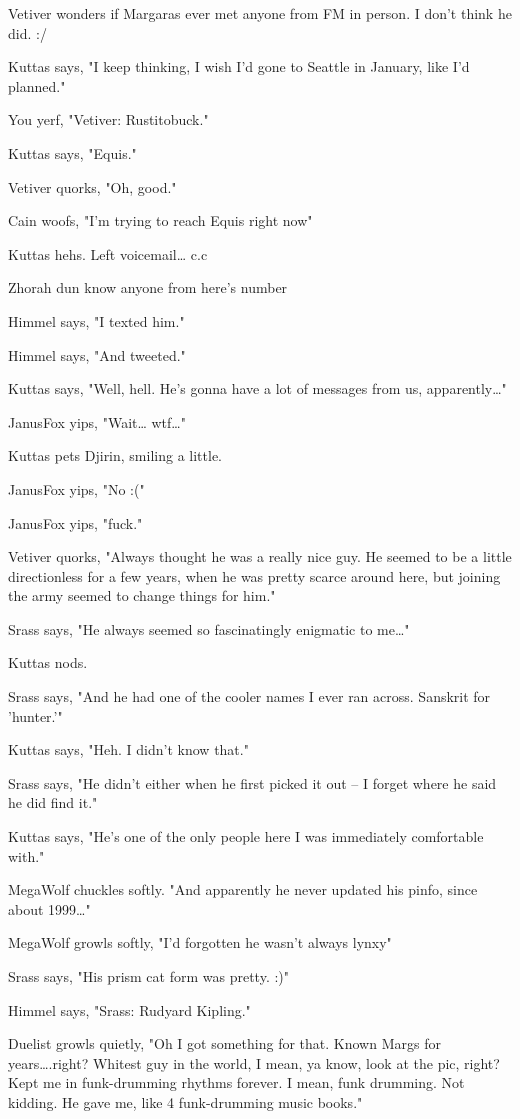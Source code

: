 \begin{hangparas}{2em}{1}
Vetiver wonders if Margaras ever met anyone from FM in person. I don't think he did. :/

Kuttas says, "I keep thinking, I wish I'd gone to Seattle in January, like I'd planned."

You yerf, "Vetiver: Rustitobuck."

Kuttas says, "Equis."

Vetiver quorks, "Oh, good."

Cain woofs, "I'm trying to reach Equis right now"

Kuttas hehs. Left voicemail\ldots{} c.c

Zhorah dun know anyone from here's number

Himmel says, "I texted him."

Himmel says, "And tweeted."

Kuttas says, "Well, hell. He's gonna have a lot of messages from us, apparently\ldots{}"

JanusFox yips, "Wait\ldots{} wtf\ldots{}"

Kuttas pets Djirin, smiling a little.

JanusFox yips, "No :("

JanusFox yips, "fuck."

Vetiver quorks, "Always thought he was a really nice guy. He seemed to be a little directionless for a few years, when he was pretty scarce around here, but joining the army seemed to change things for him."

Srass says, "He always seemed so fascinatingly enigmatic to me\ldots{}"

Kuttas nods.

Srass says, "And he had one of the cooler names I ever ran across.  Sanskrit for 'hunter.'"

Kuttas says, "Heh. I didn't know that."

Srass says, "He didn't either when he first picked it out -- I forget where he said he did find it."

Kuttas says, "He's one of the only people here I was immediately comfortable with."

MegaWolf chuckles softly. "And apparently he never updated his pinfo, since about 1999\ldots{}"

MegaWolf growls softly, "I'd forgotten he wasn't always lynxy"

Srass says, "His prism cat form was pretty. :)"

Himmel says, "Srass: Rudyard Kipling."

Duelist growls quietly, "Oh I got something for that. Known Margs for years\ldots{}.right? Whitest guy in the world, I mean, ya know, look at the pic, right? Kept me in funk-drumming rhythms forever. I mean, funk drumming. Not kidding. He gave me, like 4 funk-drumming music books."


\end{hangparas}
